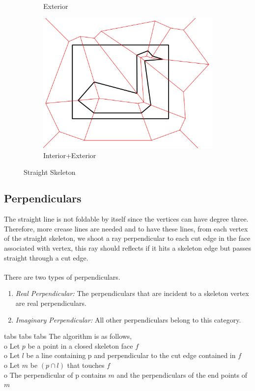 \documentclass[11pt]{article}
\begin{document}
\begin{figure}[H]
\begin{subfigure}[b]{0.4\textwidth}
    \caption{Exterior}
     \label{fig:2}
  \end{subfigure}
    \begin{subfigure}[b]{0.5\textwidth}
    \includegraphics[width=\textwidth]{FIGS/Part1/swan}
    \caption{Interior+Exterior}
     \label{fig:3}
  \end{subfigure}
    \caption{Straight Skeleton}
    \label{fig:swan}
\end{figure}


\subsection{Perpendiculars}
The straight line is not foldable by itself since the vertices can have degree three. Therefore, more crease lines are needed and to have these lines, from each vertex of the straight skeleton, we shoot a ray perpendicular to each cut edge in the face associated with vertex, this ray should reflects if it hits a skeleton edge but passes straight through a cut edge.\\\\
There are two types of perpendiculars.
\begin{enumerate}
\item \emph{Real Perpendicular:} The perpendiculars that are incident to a skeleton vertex are real perpendiculars.
\item \emph{Imaginary Perpendicular:} All other perpendiculars belong to this category.
\end{enumerate}

\begin{tabbing}
tabs \= tabs \= tabs  \kill
The algorithm is as follows,\\
\> o Let $p$ be a point in a closed skeleton face $f$\\
\> o Let $l$ be a line containing p and perpendicular to the cut edge contained in $f$\\
\> o Let $m$ be $(p \cap l)$ that touches $f$\\
\> o The perpendicular of  p contains $m$ and the perpendiculars of the end points of $m$\\
\end{tabbing}
\end{document}
